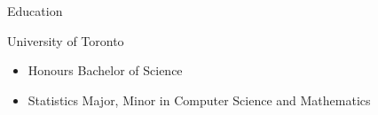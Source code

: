 \documentclass{article}
\newlength{\tabin}
\newlength{\secsep}
\newcommand{\lineunder}{\vspace*{-8pt} \\ \hspace*{-6pt} \hrulefill \\ \vspace*{-15pt}}
\newenvironment{tabbedsection}[1]{
  \begin{list}{}{
      \setlength{\itemsep}{0pt}
      \setlength{\labelsep}{0pt}
      \setlength{\labelwidth}{0pt}
      \setlength{\leftmargin}{\tabin}
      \setlength{\rightmargin}{\tabin}
      \setlength{\listparindent}{0pt}
      \setlength{\parsep}{0pt}
      \setlength{\parskip}{0pt}
      \setlength{\partopsep}{0pt}
      \setlength{\topsep}{#1}
    }
  \item[]
}{\end{list}}
\newenvironment{resume_section}[1]{
  \filbreak
  \vspace{2\secsep}
  \textsc{\large#1}
  \lineunder
  \begin{tabbedsection}{\secsep}
}{\end{tabbedsection}}
\newenvironment{resume_subsection}[2][]{
  \textbf{#2} \hfill {\footnotesize #1} \hspace{2em}
  \begin{tabbedsection}{0.5\secsep}
}{\end{tabbedsection}}
\newenvironment{subitems}{
  \renewcommand{\labelitemi}{-}
  \begin{itemize}
      \setlength{\labelsep}{1em}
}{\end{itemize}}
\begin{document}
  \begin{resume_section}{Education}
    \begin{resume_subsection}{University of Toronto}
      \begin{subitems}
        \item Honours Bachelor of Science
        \item Statistics Major, Minor in Computer Science and Mathematics
      \end{subitems}
    \end{resume_subsection}
  \end{resume_section}

\end{document}

